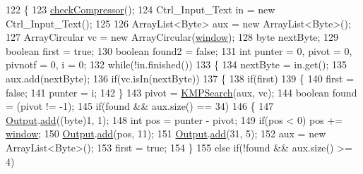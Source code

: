 \begin{DoxyCode}
122     \{
123         \hyperlink{classdomini_1_1algorithm_1_1Algorithm_a070b7e7dcc453b03751d265beae5306c}{checkCompressor}();
124         Ctrl\_Input\_Text in = \textcolor{keyword}{new} Ctrl\_Input\_Text();
125 
126         ArrayList<Byte> aux = \textcolor{keyword}{new} ArrayList<Byte>();
127         ArrayCircular vc = \textcolor{keyword}{new} ArrayCircular(\hyperlink{classdomini_1_1algorithm_1_1LZSS_a00d9f2e9bc2baa39513fad040b8e7123}{window});
128         byte nextByte;
129         \textcolor{keywordtype}{boolean} first = \textcolor{keyword}{true};
130         \textcolor{keywordtype}{boolean} found2 = \textcolor{keyword}{false};
131         \textcolor{keywordtype}{int} punter = 0, pivot = 0, pivnotf = 0, i = 0;
132         \textcolor{keywordflow}{while}(!in.finished())
133         \{
134             nextByte = in.get();
135             aux.add(nextByte);
136             \textcolor{keywordflow}{if}(vc.isIn(nextByte))
137             \{
138                 \textcolor{keywordflow}{if}(first)
139                 \{
140                     first = \textcolor{keyword}{false};
141                     punter = i;
142                 \}
143                 pivot = \hyperlink{classdomini_1_1algorithm_1_1LZSS_a94b98f9eb4a4f60b9b773ecbf7fba276}{KMPSearch}(aux, vc);
144                 \textcolor{keywordtype}{boolean} found = (pivot != -1);
145                 \textcolor{keywordflow}{if}(found && aux.size() == 34)
146                 \{
147                     \hyperlink{classdomini_1_1algorithm_1_1Algorithm_a4de9955411c656325adc391ef570c082}{Output}.\hyperlink{classpersistencia_1_1output_1_1Ctrl__Output_a8c5aa5a6acb5259faeb1c05c71ddd21c}{add}((byte)1, 1);
148                     \textcolor{keywordtype}{int} pos = punter - pivot;
149                     \textcolor{keywordflow}{if}(pos < 0) pos += \hyperlink{classdomini_1_1algorithm_1_1LZSS_a00d9f2e9bc2baa39513fad040b8e7123}{window};
150                     \hyperlink{classdomini_1_1algorithm_1_1Algorithm_a4de9955411c656325adc391ef570c082}{Output}.\hyperlink{classpersistencia_1_1output_1_1Ctrl__Output_a8c5aa5a6acb5259faeb1c05c71ddd21c}{add}(pos, 11);
151                     \hyperlink{classdomini_1_1algorithm_1_1Algorithm_a4de9955411c656325adc391ef570c082}{Output}.\hyperlink{classpersistencia_1_1output_1_1Ctrl__Output_a8c5aa5a6acb5259faeb1c05c71ddd21c}{add}(31, 5);
152                     aux = \textcolor{keyword}{new} ArrayList<Byte>();
153                     first = \textcolor{keyword}{true};
154                 \}
155                 \textcolor{keywordflow}{else} \textcolor{keywordflow}{if}(!found && aux.size() >= 4)

\end{DoxyCode}

